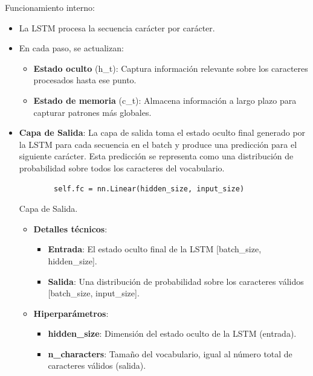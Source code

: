\documentclass{article}
\begin{document}
{\large{Funcionamiento interno}}:
\begin{itemize}
    \item La LSTM procesa la secuencia carácter por carácter.
    \item En cada paso, se actualizan:
    \begin{itemize}
        \item \textbf{Estado oculto} (h\_t): Captura información relevante sobre los caracteres procesados hasta ese punto.
        \item \textbf{Estado de memoria} (c\_t): Almacena información a largo plazo para capturar patrones más globales.
    \end{itemize}
\end{itemize}

\newpage

\begin{itemize}
    \item \textbf{Capa de Salida}: La capa de salida toma el estado oculto final generado por la LSTM para cada secuencia en el batch y produce una predicción para el siguiente carácter. Esta predicción se representa como una distribución de probabilidad sobre todos los caracteres del vocabulario.
    \begin{listing}[H]
    \begin{verbatim}
        self.fc = nn.Linear(hidden_size, input_size)
    \end{verbatim}
    \caption{Capa de Salida.}
    \end{listing}
    \begin{itemize}
        \item \textbf{Detalles técnicos}:
        \begin{itemize}
            \item \textbf{Entrada}: El estado oculto final de la LSTM [batch\_size, hidden\_size].
            \item \textbf{Salida}: Una distribución de probabilidad sobre los caracteres válidos [batch\_size, input\_size].
        \end{itemize}
        \item \textbf{Hiperparámetros}:
        \begin{itemize}
            \item \textbf{hidden\_size}: Dimensión del estado oculto de la LSTM (entrada).
            \item \textbf{n\_characters}: Tamaño del vocabulario, igual al número total de caracteres válidos (salida).
        \end{itemize}
    \end{itemize}
\end{itemize}
\end{document}
